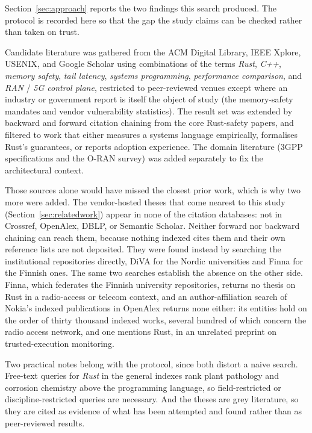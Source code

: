 \documentclass[english,twoside,openright,a4paper,censored,csm,software-track-2020]{HYthesisML}
\begin{document}
\begin{appendices}
Section~\ref{sec:approach} reports the two findings this search produced. The protocol is recorded
here so that the gap the study claims can be checked rather than taken on trust.

Candidate literature was gathered from the ACM Digital Library, IEEE Xplore, USENIX, and Google
Scholar using combinations of the terms \emph{Rust}, \emph{C++}, \emph{memory safety}, \emph{tail
latency}, \emph{systems programming}, \emph{performance comparison}, and \emph{RAN} / \emph{5G
control plane}, restricted to peer-reviewed venues except where an industry or government report
is itself the object of study (the memory-safety mandates and vendor vulnerability statistics).
The result set was extended by backward and forward citation chaining from the core Rust-safety
papers, and filtered to work that either measures a systems language empirically, formalises
Rust's guarantees, or reports adoption experience. The domain literature (3GPP specifications and
the O-RAN survey) was added separately to fix the architectural context.

Those sources alone would have missed the closest prior work, which is why two more were added.
The vendor-hosted theses that come nearest to this study (Section~\ref{sec:relatedwork}) appear in
none of the citation databases: not in Crossref, OpenAlex, DBLP, or Semantic Scholar. Neither
forward nor backward chaining can reach them, because nothing indexed cites them and their own
reference lists are not deposited. They were found instead by searching the institutional
repositories directly, DiVA for the Nordic universities and Finna for the Finnish ones. The same
two searches establish the absence on the other side. Finna, which federates the Finnish
university repositories, returns no thesis on Rust in a radio-access or telecom context, and an
author-affiliation search of Nokia's indexed publications in OpenAlex returns none either: its
entities hold on the order of thirty thousand indexed works, several hundred of which concern the
radio access network, and one mentions Rust, in an unrelated preprint on trusted-execution
monitoring.

Two practical notes belong with the protocol, since both distort a naive search. Free-text queries
for \emph{Rust} in the general indexes rank plant pathology and corrosion chemistry above the
programming language, so field-restricted or discipline-restricted queries are necessary. And the
theses are grey literature, so they are cited as evidence of what has been attempted and found
rather than as peer-reviewed results.


\end{appendices}
\end{document}

